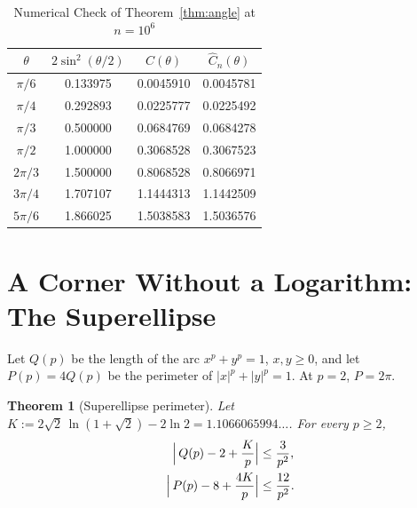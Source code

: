 \documentclass[journal]{IEEEtran}
\newtheorem{theorem}{Theorem}
\begin{document}
\begin{table}[!t]
\caption{Numerical Check of Theorem~\ref{thm:angle} at $n=10^6$}
\label{tab:angle}
\centering
\renewcommand{\arraystretch}{1.2}
\begin{tabular}{@{}cccc@{}}
\toprule
$\theta$ & $2\sin^2(\theta/2)$ & $C(\theta)$ & $\widehat C_n(\theta)$\\
\midrule
$\pi/6$  & 0.133975 & 0.0045910 & 0.0045781\\
$\pi/4$  & 0.292893 & 0.0225777 & 0.0225492\\
$\pi/3$  & 0.500000 & 0.0684769 & 0.0684278\\
$\pi/2$  & 1.000000 & 0.3068528 & 0.3067523\\
$2\pi/3$ & 1.500000 & 0.8068528 & 0.8066971\\
$3\pi/4$ & 1.707107 & 1.1444313 & 1.1442509\\
$5\pi/6$ & 1.866025 & 1.5038583 & 1.5036576\\
\bottomrule
\end{tabular}
\end{table}

\section{A Corner Without a Logarithm: The Superellipse}\label{sec:squircle}

Let $Q(p)$ be the length of the arc $x^p+y^p=1$, $x,y\ge0$, and let $P(p)=4Q(p)$ be the
perimeter of $|x|^p+|y|^p=1$. At $p=2$, $P=2\pi$.

\begin{theorem}[Superellipse perimeter]\label{thm:squircle}
Let $K:=2\sqrt2\,\ln(1+\sqrt2)-2\ln2=1.1066065994\ldots$. For every $p\ge2$,
\begin{align*}
  \Bigl|\,Q(p)-2+\frac{K}{p}\Bigr|&\le\frac{3}{p^2},\\
  \Bigl|\,P(p)-8+\frac{4K}{p}\Bigr|&\le\frac{12}{p^2}.
\end{align*}
\end{theorem}
\end{document}
